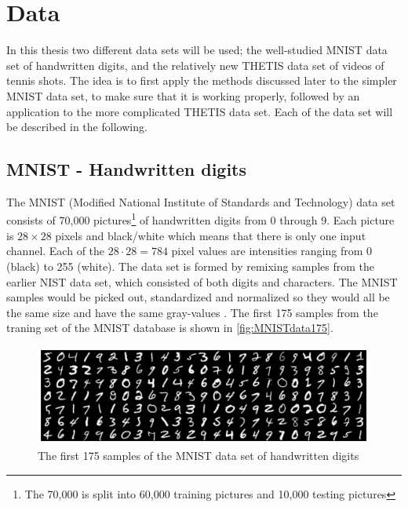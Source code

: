 \section{Data} \label{tex:data}

In this thesis two different data sets will be used; the well-studied MNIST data set \cite{MNIST} of handwritten digits, and the relatively new THETIS data set \cite{Gourgari2013} of videos of tennis shots. The idea is to first apply the methods discussed later to the simpler MNIST data set, to make sure that it is working properly, followed by an application to the more complicated THETIS data set. Each of the data set will be described in the following. 

\subsection{MNIST - Handwritten digits}
The MNIST (Modified National Institute of Standards and Technology) data set \cite{MNIST} consists of 70,000 pictures\footnote{The 70,000 is split into 60,000 training pictures and 10,000 testing pictures} of handwritten digits from 0 through 9. Each picture is $28\times 28$ pixels and black/white which means that there is only one input channel. Each of the $28\cdot 28 = 784$ pixel values are intensities ranging from 0 (black) to 255 (white). The data set is formed by remixing samples from the earlier NIST data set, which consisted of both digits and characters. The MNIST samples would be picked out, standardized and normalized so they would all be the same size and have the same gray-values \cite{mnistdatabase}. The first 175 samples from the traning set of the MNIST database is shown in \autoref{fig:MNISTdata175}. 

\begin{figure}[H]
    \centering
    \includegraphics[width=\linewidth]{Pics/04_Data/MNIST.png}
    \caption{The first 175 samples of the MNIST data set of handwritten digits}
    \label{fig:MNISTdata175}
\end{figure}

